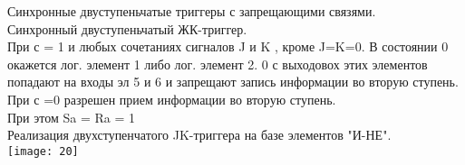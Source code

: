 Синхронные двуступеньчатые триггеры с запрещающими связями.\\
Синхронный двуступеньчатый ЖК-триггер.\\

При с = 1 и любых сочетаниях сигналов J и K , кроме J=K=0. В состоянии 0 окажется лог. элемент 1 либо лог. элемент 2.
0 с выходовох этих элементов попадают на входы эл 5 и 6 и запрещают запись информации во вторую ступень.\\
При с =0 разрешен прием информации во вторую ступень.\\
При этом Sa = Ra = 1 \\
Реализация двухступенчатого JK-триггера на базе элементов "И-НЕ".\\
\texttt{[image: 20]}
